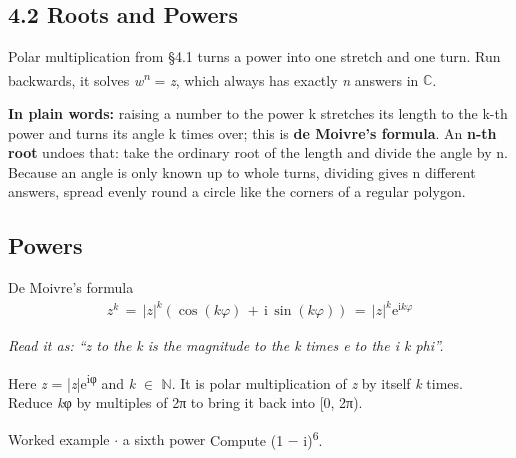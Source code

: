 \documentclass[11pt]{article}
\begin{document}
\begin{keepsection}
\section{4.2 Roots and Powers}

Polar multiplication from §4.1 turns a power into one stretch and one turn. Run backwards, it solves \textit{w}\textsuperscript{\textit{n}} = \textit{z}, which always has exactly \textit{n} answers in \ensuremath{\mathbb{C}}.

\begin{plainbox}\textbf{In plain words:} raising a number to the power k stretches its length to the k-th power and turns its angle k times over; this is \textbf{de Moivre’s formula}. An \textbf{n-th root} undoes that: take the ordinary root of the length and divide the angle by n. Because an angle is only known up to whole turns, dividing gives n different answers, spread evenly round a circle like the corners of a regular polygon.\end{plainbox}

\begin{keepsection}
\subsection{Powers}

\begin{equationcard}{De Moivre’s formula}
\[ \begin{gathered} {z}^{{k}}\, =\, |{z}|^{{k}}(\cos ({k}φ)\, +\, \mathrm{i}\, \sin ({k}φ))\, =\, |{z}|^{{k}}\mathrm{e}^{\mathrm{i}{k}φ} \end{gathered} \]
{\small \emph{Read it as: “z to the k is the magnitude to the k times e to the i k phi”.}\par Here \textit{z} = |\textit{z}|e\textsuperscript{iφ} and \textit{k} \ensuremath{\in} \ensuremath{\mathbb{N}}. It is polar multiplication of \textit{z} by itself \textit{k} times. Reduce \textit{k}φ by multiples of 2π to bring it back into [0, 2π).}
\end{equationcard}

\begin{workedbox}{Worked example \ensuremath{\cdot} a sixth power}
Compute (1 \ensuremath{-} i)\textsuperscript{6}.


\end{workedbox}
\end{keepsection}
\end{keepsection}
\end{document}
